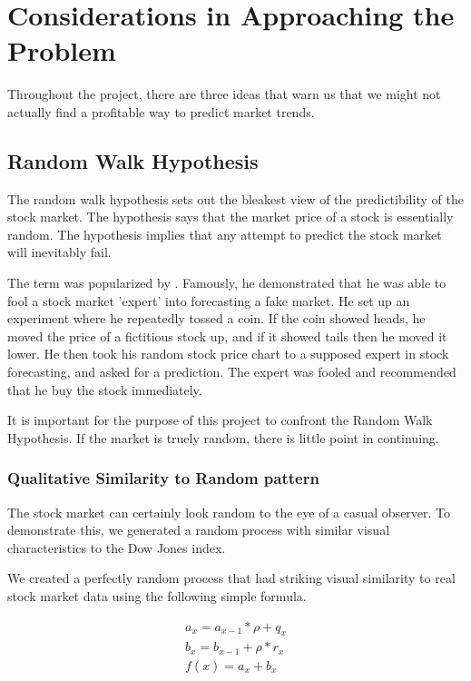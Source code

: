 \documentclass{report}
\begin{document}
\chapter{Considerations in Approaching the Problem}

Throughout the project, there are three ideas that warn us that we might not actually find a profitable way to predict market trends.

\section{Random Walk Hypothesis}

The random walk hypothesis sets out the bleakest view of the predictibility of the stock market. The hypothesis says that the market price of a stock is essentially random. The hypothesis implies that any attempt to predict the stock market will inevitably fail. 

The term was popularized by \citet{malkiel1999random}. Famously, he demonstrated that he was able to fool a stock market 'expert' into forecasting a fake market. He set up an experiment where he repeatedly tossed a coin. If the coin showed heads, he moved the price of a fictitious stock up, and if it showed tails then he moved it lower. He then took his random stock price chart to a supposed expert in stock forecasting, and asked for a prediction. The expert was fooled and recommended that he buy the stock immediately. 

It is important for the purpose of this project to confront the Random Walk Hypothesis. If the market is truely random, there is little point in continuing. 

\subsection{Qualitative Similarity to Random pattern}

The stock market can certainly look random to the eye of a casual observer. To demonstrate this, we generated a random process with similar visual characteristics to the Dow Jones index.

We created a perfectly random process that had striking visual similarity to real stock market data using the following simple formula.

\begin{align*}
	a_{x} = a_{x-1} * \rho + q_{x}\\
	b_{x} = b_{x-1} + \rho * r_{x}\\
	f(x) = a_{x} + b_{x}\\
\end{align*}
\end{document}
